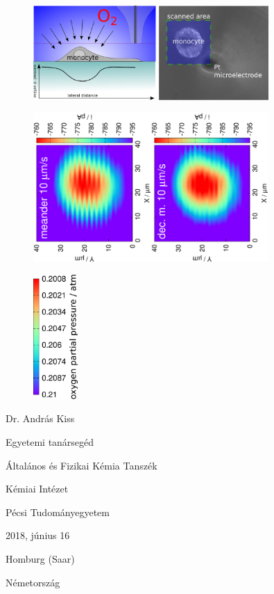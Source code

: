 \documentclass[a4paper, 11pt, oneside, bibliography=totoc]{article}
\begin{document}
\begin{figure}
\centering
 \includegraphics[width=0.8\textwidth]{oxygen.eps}

        \includegraphics[trim = 10mm 20mm 0mm 20mm, clip, width=0.4\textwidth, angle=-90]{9_41.eps}\includegraphics[trim = 10mm 20mm 0mm 20mm, clip, width=0.4\textwidth, angle=-90]{9_41_meandered_deconvoluted.eps}

\includegraphics[width=0.15\textwidth, angle=-90]{atm.eps}
\label{fig:oxygen}
\end{figure}


Dr. András Kiss

Egyetemi tanársegéd

Általános és Fizikai Kémia Tanszék

Kémiai Intézet

Pécsi Tudományegyetem


2018, június 16

Homburg (Saar)

Németország


{}

\end{document}
